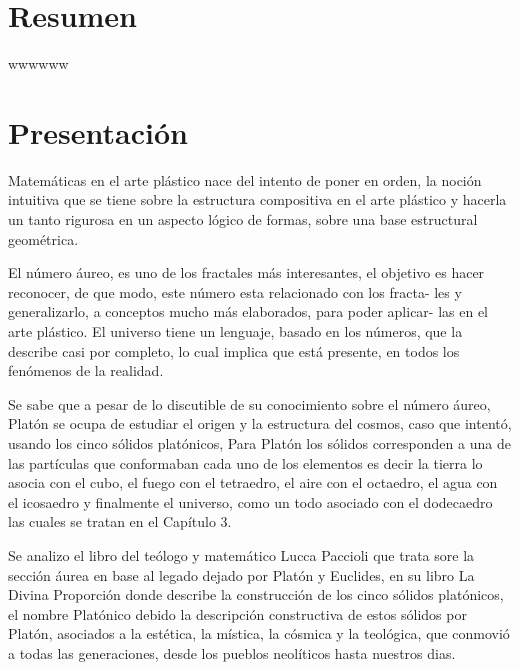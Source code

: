 \documentclass[12pt,a4paper]{book}
\begin{document}
\renewcommand\listtablename{Lista de tablas}
\listoftables

\chapter*{Resumen}

wwwwww


\chapter*{Presentación}


Matemáticas en el arte plástico nace del intento de poner en orden, la  noción intuitiva que se tiene sobre la estructura compositiva en el arte plástico y hacerla un tanto rigurosa en un aspecto lógico de formas, sobre una
base estructural geométrica.

El número áureo, es uno de los fractales más interesantes, el objetivo es
hacer reconocer, de que modo, este número esta relacionado con los fracta-
les y generalizarlo, a conceptos mucho más elaborados, para poder aplicar-
las en el arte plástico. El universo tiene un lenguaje, basado en los números,
que la describe casi por completo, lo cual implica que está presente, en todos
los fenómenos de la realidad.

Se sabe que a pesar de lo discutible de su conocimiento sobre el número
áureo, Platón se ocupa de estudiar el origen y la estructura del cosmos,
caso que intentó, usando los cinco sólidos platónicos, Para Platón los sólidos
corresponden a una de las partículas que conformaban cada uno de los
elementos es decir la tierra lo asocia con el cubo, el fuego con el tetraedro,
el aire con el octaedro, el agua con el icosaedro y finalmente el universo,
como un todo asociado con el dodecaedro las cuales se tratan en el Capítulo 3.

Se analizo el libro del teólogo y matemático Lucca Paccioli que trata
sore la sección áurea en base al legado dejado por Platón y Euclides, en
su libro La Divina Proporción donde describe la construcción de los cinco
sólidos platónicos, el nombre Platónico debido la descripción constructiva
de estos sólidos por Platón, asociados a la estética, la mística, la cósmica
y la teológica, que conmovió a todas las generaciones, desde los pueblos
neolíticos hasta nuestros dias.
\end{document}

